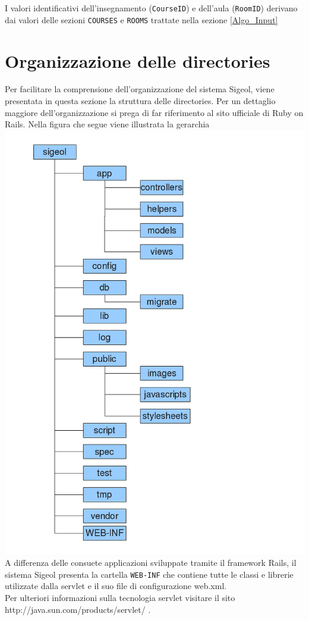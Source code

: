 \documentclass[11pt,a4paper]{article}
\begin{document}
I valori identificativi dell'insegnamento (\verb|CourseID|) e dell'aula (\verb|RoomID|) derivano dai valori delle sezioni \verb|COURSES| e \verb|ROOMS| trattate nella sezione \ref{Algo_Input}
\section{Organizzazione delle directories}
Per facilitare la comprensione dell'organizzazione del sistema Sigeol, viene presentata in questa sezione la struttura delle directories. Per un dettaglio maggiore dell'organizzazione si prega di far riferimento al sito ufficiale di Ruby on Rails. Nella figura che segue viene illustrata la gerarchia \\
\includegraphics[scale=0.59]{images/gerarchiacartelle.png}
A differenza delle consuete applicazioni sviluppate tramite il framework Rails, il sistema Sigeol presenta la cartella \verb|WEB-INF| che contiene tutte le classi e librerie utilizzate dalla servlet e il suo file di configurazione web.xml.\\ Per ulteriori informazioni sulla tecnologia servlet visitare il sito \\ http://java.sun.com/products/servlet/ .
\end{document}
